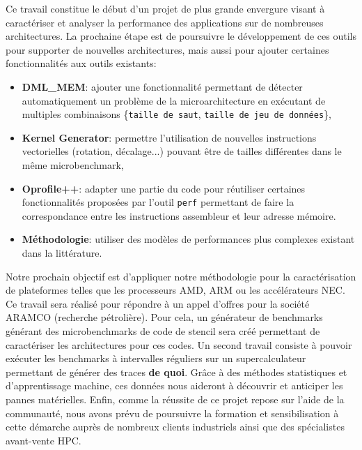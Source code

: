     Ce travail constitue le début d'un projet de plus grande envergure visant à caractériser et analyser la performance des applications sur de nombreuses architectures. La prochaine étape est de poursuivre le développement de ces outils pour supporter de nouvelles architectures, mais aussi pour ajouter certaines fonctionnalités aux outils existants:
    \begin{itemize}
        \item \textbf{DML\_MEM}: ajouter une fonctionnalité permettant de détecter automatiquement un problème de la microarchitecture en exécutant de multiples combinaisons \{\verb|taille de saut|, \verb|taille de jeu de données|\},
        \item \textbf{Kernel Generator}: permettre l'utilisation de nouvelles instructions vectorielles (rotation, décalage...) pouvant être de tailles différentes dans le même microbenchmark,
        \item \textbf{Oprofile++}: adapter une partie du code pour réutiliser certaines fonctionnalités proposées par l'outil \verb|perf| permettant de faire la correspondance entre les instructions assembleur et leur adresse mémoire.
        \item \textbf{Méthodologie}: utiliser des modèles de performances plus complexes existant dans la littérature.
    \end{itemize}

    Notre prochain objectif est d’appliquer notre méthodologie pour la caractérisation de plateformes telles que les processeurs AMD, ARM ou les accélérateurs NEC. Ce travail sera réalisé pour répondre à un appel d’offres pour la société ARAMCO (recherche pétrolière). Pour cela, un générateur de \glspl{benchmark} générant des microbenchmarks de code de stencil sera créé permettant de caractériser les architectures pour ces codes. Un second travail consiste à pouvoir exécuter les benchmarks à intervalles réguliers sur un supercalculateur permettant de générer des traces \textbf{de quoi}. Grâce à des méthodes statistiques et d'apprentissage machine, ces données nous aideront à découvrir et anticiper les pannes matérielles. Enfin, comme la réussite de ce projet repose sur l’aide de la communauté, nous avons prévu de poursuivre la formation et sensibilisation à cette démarche auprès de nombreux clients industriels ainsi que des spécialistes avant-vente HPC.
    


